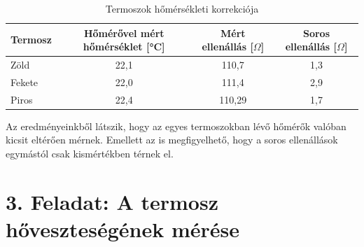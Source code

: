 \documentclass{article}
\begin{document}
\begin{table}[H]
    \centering
    \renewcommand{\arraystretch}{1.2}
    \begin{tabular}{|l|c|c|c|}
        \hline
        Termosz & Hőmérővel mért hőmérséklet [°C] & Mért ellenállás [$\Omega$] & Soros ellenállás [$\Omega$] \\ \hline
        Zöld & 22,1 & 110,7 & 1,3 \\ \hline
        Fekete & 22,0 & 111,4 & 2,9 \\ \hline
        Piros & 22,4 & 110,29 & 1,7 \\ \hline
    \end{tabular}
    \caption{Termoszok hőmérsékleti korrekciója}
    \label{tab:hotan_2}
\end{table}

Az eredményeinkből látszik, hogy az egyes termoszokban lévő hőmérők valóban kicsit eltérően mérnek. Emellett az is megfigyelhető, hogy a soros ellenállások egymástól csak kismértékben térnek el.


\section*{3. Feladat: A termosz hőveszteségének mérése}
\end{document}
